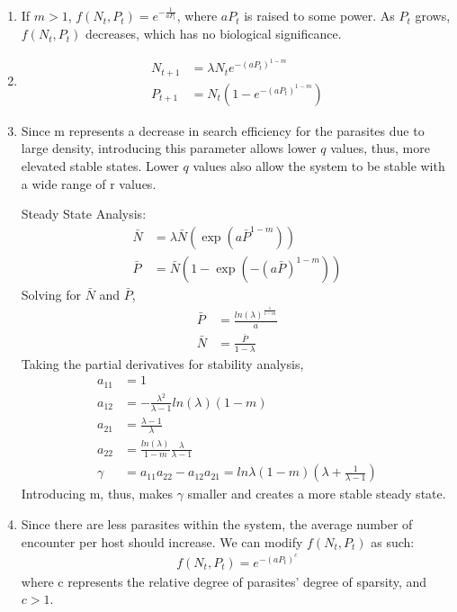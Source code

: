 \begin{homeworkProblem}[10]
\begin{enumerate}
    \item 
    If $m > 1$, $f(N_t, P_t) = e^{-\frac{1}{aP_t}}$, where $aP_t$ is raised to some power. As $P_t$ grows, $f(N_t, P_t)$ decreases, which has no biological significance.
    
    \item 
    \begin{align*}
        N_{t+1} &= \lambda N_{t} e^{-(aP_t)^{1-m}}\\
        P_{t+1} &= N_t (1 - e^{-(aP_t)^{1-m}})
    \end{align*}
    
    \item
    Since m represents a decrease in search efficiency for the parasites due to large density, introducing this parameter allows lower $q$ values, thus, more elevated stable states. Lower $q$ values also allow the system to be stable with a wide range of r values. 
    
    Steady State Analysis: \begin{align*}
        \bar{N} &= \lambda \bar{N} (\exp(a\bar{P}^{1-m}))\\
        \bar{P} &= \bar{N} (1 - \exp(-(a \bar{P})^{1-m}))
    \end{align*}
    Solving for $\bar{N}$ and $\bar{P}$, \begin{align*}
        \bar{P} &= \frac{ln(\lambda)^{\frac{1}{1-m}}}{a}\\
        \bar{N} &= \frac{\bar{P}}{1-\lambda}
    \end{align*}
    Taking the partial derivatives for stability analysis, \begin{align}
        a_{11} &= 1 \\
        a_{12} &= -\frac{\lambda^2}{\lambda - 1}ln(\lambda)(1-m) \\
        a_{21} &= \frac{\lambda - 1}{\lambda} \\
        a_{22} &= \frac{ln(\lambda)}{1-m}\frac{\lambda}{\lambda-1}\\
        \gamma &= a_{11}a_{22}-a_{12}a_{21} = ln\lambda (1-m)(\lambda + \frac{1}{\lambda -1 })
    \end{align}
    Introducing m, thus, makes $\gamma$ smaller and creates a more stable steady state.
    
    \item Since there are less parasites within the system, the average number of encounter per host should increase. We can modify $f(N_t, P_t)$ as such: \begin{align*}
        f(N_t, P_t) = e^{-(aP_t)^{c}}
    \end{align*}
    where c represents the relative degree of parasites' degree of sparsity, and $c > 1$.
    
    
\end{enumerate}
\end{homeworkProblem}
